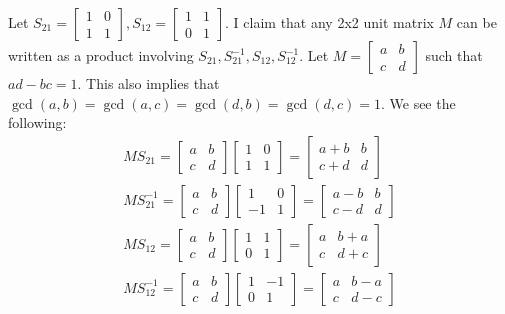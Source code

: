 \documentclass{article}
\def\0{\textbf{0}}
\begin{document}
Let $S_{21}=\begin{bmatrix}1 & 0\\1 & 1\end{bmatrix}, S_{12}=\begin{bmatrix}1 & 1\\0 & 1\end{bmatrix}$. I claim that any 2x2 unit matrix $M$ can be written as a product involving $S_{21},S_{21}^{-1},S_{12},S_{12}^{-1}$. Let $M=\begin{bmatrix}a & b\\c & d\end{bmatrix}$ such that $ad-bc=1$. This also implies that $\gcd(a,b)=\gcd(a,c)=\gcd(d,b)=\gcd(d,c)=1$. We see the following:
\begin{gather*}
    MS_{21}=\begin{bmatrix}a & b\\c & d\end{bmatrix}\begin{bmatrix}1 & 0\\1 & 1\end{bmatrix}=\begin{bmatrix}a+b & b\\c+d & d\end{bmatrix}\\
    MS_{21}^{-1}=\begin{bmatrix}a & b\\c & d\end{bmatrix}\begin{bmatrix}1 & 0\\-1 & 1\end{bmatrix}=\begin{bmatrix}a-b & b\\c-d & d\end{bmatrix}\\
    MS_{12}=\begin{bmatrix}a & b\\c & d\end{bmatrix}\begin{bmatrix}1 & 1\\0 & 1\end{bmatrix}=\begin{bmatrix}a & b+a\\c & d+c\end{bmatrix}\\
    MS_{12}^{-1}=\begin{bmatrix}a & b\\c & d\end{bmatrix}\begin{bmatrix}1 & -1\\0 & 1\end{bmatrix}=\begin{bmatrix}a & b-a\\c & d-c\end{bmatrix}
\end{gather*}
\end{document}
